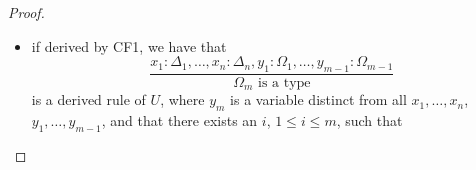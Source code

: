 \begin{proof}
\begin{itemize}
            are derived rules of $U$.
            So by the first rule, due to the equivalence realization
            of identity of denotation, we know that 
            \begin{multline*}
                \langle y_1 : \Omega_1, \dots, y_m : \Omega_m, z_j : \Delta \rangle_A
                \equiv \\
                \langle y_1 : \Omega_1, \dots, y_m : \Omega_m, z_j : \Lambda_j[t_1 | z_1, \dots, t_{j-1} | z_{j-1}] \rangle_A
            \end{multline*}
            hence they are the same object in $C_A$.
            And by the second one, applying induction, we have that 
            \begin{equation*}
                \langle y_1 : \Omega_1, \dots, y_m : \Omega_m \rangle_A 
                \xrightarrow{ \langle y_1, \dots, y_m, t_j \rangle_A }
                \langle y_1 : \Omega_1, \dots, y_m : \Omega_m, z_j : \Delta \rangle_A
            \end{equation*}
            is constructible by expansion, so as 
            $\langle y_1 : \Omega_1, \dots, y_m : \Omega_m, z_j : \Delta \rangle_A$
            and 
            $\langle y_1 : \Omega_1, \dots, y_m : \Omega_m, z_j : \Lambda_j[t_1 | z_1, \dots, t_{j-1} | z_{j-1}] \rangle_A$
            are the same object in $C_A$, then
            \begin{equation*} %
                \langle y_1 : \Omega_1, \dots, y_m : \Omega_m \rangle_A 
                \xrightarrow{ \langle y_1, \dots, y_m, t_j \rangle_A }
                \langle y_1 : \Omega_1, \dots, y_m : \Omega_m, z_j : \Lambda_j[t_1 | z_1, \dots, t_{j-1} | z_{j-1}] \rangle_A
            \end{equation*}
            is constructible by expansion.
        \item if derived by CF1, we have that
            \begin{equation*}
                \dfrac{
                    x_1 : \Delta_1, \dots, x_n : \Delta_n,
                    y_1 : \Omega_1, \dots, y_{m-1} : \Omega_{m-1}
                }{
                    \Omega_m \text{ is a type}
                }
            \end{equation*}
            is a derived rule of $U$, where $y_m$ is a variable 
            distinct from all $x_1, \dots, x_n$, $y_1, \dots, y_{m-1}$,
            and that there exists an $i$, $1 \leq i \leq m$, such that
            \begin{equation*} %

\end{equation*}
\end{itemize}
\end{proof}
